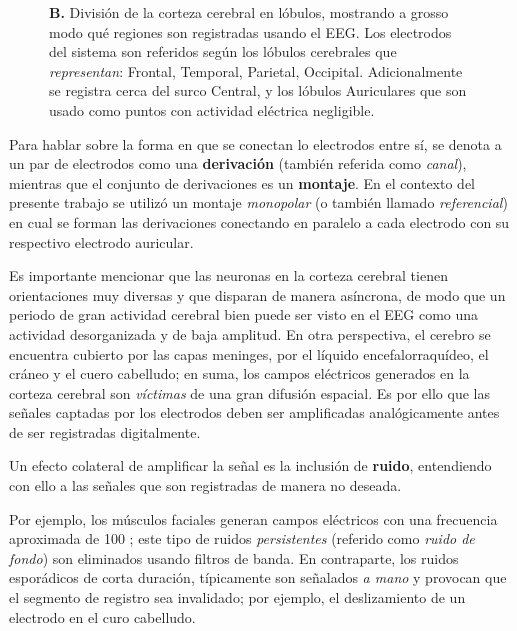 \begin{figure}
{%
\textbf{B.} División de la corteza cerebral en lóbulos, mostrando a grosso modo qué regiones son registradas usando el EEG. Los electrodos del sistema son referidos según los lóbulos cerebrales que \textit{representan}: Frontal, Temporal, Parietal, Occipital. Adicionalmente se registra cerca del surco Central, y los lóbulos Auriculares que son usado como puntos con actividad eléctrica negligible.
}
\label{img1020}
\end{figure}

Para hablar sobre la forma en que se conectan lo electrodos entre sí, se denota a un par de electrodos como una \textbf{derivación} (también referida como \textit{canal}), mientras que el conjunto de derivaciones es un \textbf{montaje}.
%
En el contexto del presente trabajo se utilizó un montaje \textit{monopolar} (o también llamado \textit{referencial}) en cual se forman las derivaciones conectando en paralelo a cada electrodo con su respectivo electrodo auricular.

Es importante mencionar que las neuronas en la corteza cerebral tienen orientaciones muy diversas y que disparan de manera asíncrona, de modo que un periodo de gran actividad cerebral bien puede ser visto en el EEG como una actividad desorganizada y de baja amplitud.
%
En otra perspectiva, el cerebro se encuentra cubierto por las capas meninges, por el líquido encefalorraquídeo, el cráneo y el cuero cabelludo; en suma, los campos eléctricos generados en la corteza cerebral son \textit{víctimas} de una gran difusión espacial.
%
Es por ello que las señales captadas por los electrodos deben ser amplificadas analógicamente antes de ser registradas digitalmente.

Un efecto colateral de amplificar la señal es la inclusión de \textbf{ruido}, entendiendo con ello a las señales que son registradas de manera no deseada.

Por ejemplo, los músculos faciales generan campos eléctricos con una frecuencia aproximada de 100 \hz; este tipo de ruidos \textit{persistentes} (referido como \textit{ruido de fondo}) son eliminados usando filtros de banda.
%
En contraparte, los ruidos esporádicos de corta duración, típicamente son señalados \textit{a mano} y provocan que el segmento de registro sea invalidado; por ejemplo, el deslizamiento de un electrodo en el curo cabelludo.


